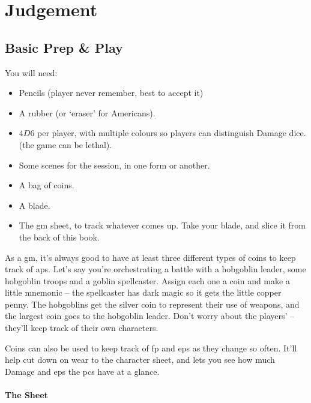 \chapter[Bastion of Judgement]{Judgement}
\label{judgement}

\section{Basic Prep \& Play}

\begin{multicols}{2}

You will need:

\begin{itemize}
  \item
  Pencils (player never remember, best to accept it)
  \item
  A rubber (or `eraser' for Americans).
  \item
  $4D6$ per player, with multiple colours so players can distinguish Damage dice.
  \iftoggle{stories}{
    \item
    A boat-load of character sheets
  }{
    Some pre-made characters, including spares
  } (the game can be lethal).
  \item
  Some scenes for the session, in one form or another.
  \item
  A bag of coins.
  \item
  A blade.
  \item
  The \gls{gm} sheet, to track whatever comes up.
  Take your blade, and slice it from the back of this book.
\end{itemize}

As a \gls{gm}, it's always good to have at least three different types of coins to keep track of \glspl{ap}.
Let's say you're orchestrating a battle with a hobgoblin leader, some hobgoblin troops and a goblin spellcaster.
Assign each one a coin and make a little mnemonic -- the spellcaster has dark magic so it gets the little copper penny.
The hobgoblins get the silver coin to represent their use of weapons, and the largest coin goes to the hobgoblin leader.
Don't worry about the players'  -- they'll keep track of their own characters.

Coins can also be used to keep track of \gls{fp} and \glspl{ep} as they change so often.
It'll help cut down on wear to the character sheet, and lets you see how much Damage and \glspl{ep} the \glspl{pc} have at a glance.

\subsubsection{The  Sheet}


\end{multicols}

